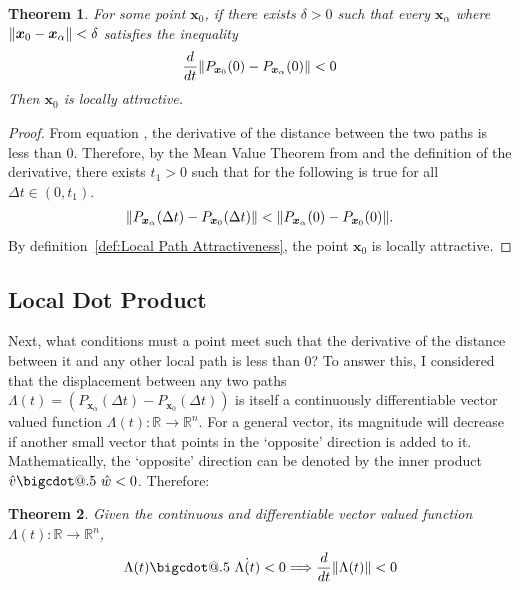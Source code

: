 \documentclass{article}
\makeatletter
\newcommand{\B}[1]{\boldsymbol{#1}}
\newcommand*\bigcdot{\mathpalette\bigcdot@{.5}}
\newcommand*\bigcdot@[2]{\mathbin{\vcenter{\hbox{\scalebox{#2}{$\m@th#1\bullet$}}}}}
\DeclarePairedDelimiter\norm{\lVert}{\rVert}%
\newtheorem{theorem}{Theorem}[section]
\theoremstyle{definition}
\theoremstyle{remark}
\makeatother
\begin{document}
\begin{theorem}
  \label{theorem:Local Distance}
  For some point $\B{x}_0$, if there exists $\delta > 0$ such that every
  $\B{x}_\alpha$ where $\norm{\B{x}_0 - \B{x}_\alpha} < \delta$ satisfies the inequality
  \begin{align}
    \frac{d}{dt} \norm{P_{\B{x}_0}(0) - P_{\B{x}_\alpha}(0)} < 0 \label{eq:norm-inequality}
  \end{align}
  Then $\B{x}_0$ is locally attractive.
\end{theorem}

\begin{proof}
  From equation , the derivative of the distance between the two paths is less than 0. 
  Therefore, by the Mean Value Theorem from \cite{AdvancedCalculus}
  and the definition of the derivative, there exists $t_1 > 0$ such that for the following is true for all 
  $\Delta t \in \left(0, t_1\right)$.
  \begin{align}
  \norm{P_{\B{x}_\alpha}(\Delta t) - P_{\B{x}_0}(\Delta t)} < \norm{P_{\B{x}_\alpha}(0) - P_{\B{x}_0}(0)}.\label{attractive-condition}
  \end{align}
  By definition~\ref{def:Local Path Attractiveness}, the point $\B{x}_0$ is locally attractive.
\end{proof}


\subsection{Local Dot Product}
Next, what conditions must a point meet such that the derivative of the distance between
it and any other local path is less than 0? To answer this, I considered that the displacement
between any two paths $\Lambda(t) = (P_{\B{x}_\alpha}(\Delta t) - P_{\B{x}_0}(\Delta t))$ is itself
a continuously differentiable vector valued function $\Lambda(t) : \mathbb{R} \to \mathbb{R}^n$. For a general vector,
its magnitude will decrease if another small vector that points in the `opposite' direction is added to it.
Mathematically, the `opposite' direction can be denoted by the inner product $\hat{v} \bigcdot~ \hat{w} < 0$.
Therefore:



\begin{theorem}
  \label{theorem:Dot Product Distance}
  Given the continuous and differentiable vector valued function $\Lambda(t) : \mathbb{R} \to \mathbb{R}^n$, 
  $$ \Lambda(t) \bigcdot~ \dot{\Lambda(t)} < 0 \Longrightarrow \frac{d}{dt}  \norm{\Lambda(t)}  < 0$$
\end{theorem}
\end{document}

